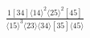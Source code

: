 \documentclass[varwidth, border=5pt]{standalone}
\begin{document}
\begin{my}
$\begin{gathered}
\scriptscriptstyle\frac{1[34]⟨14⟩^2⟨25⟩^2[45]}{⟨15⟩^3⟨23⟩⟨34⟩[35]⟨45⟩}
\end{gathered}$
\end{my}
\end{document}
